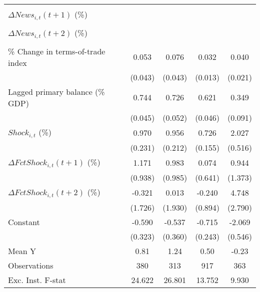 {\begin{tabular}{l*{4}{c}}
                    &                     &                     &                     &                     \\
\addlinespace
$ \Delta News_{i,t}(t+1)$ (\%)&                     &                     &                     &                     \\
                    &                     &                     &                     &                     \\
\addlinespace
$ \Delta News_{i,t}(t+2)$ (\%)&                     &                     &                     &                     \\
                    &                     &                     &                     &                     \\
\addlinespace
\% Change in terms-of-trade index&       0.053         &       0.076\sym{*}  &       0.032\sym{**} &       0.040\sym{*}  \\
                    &     (0.043)         &     (0.043)         &     (0.013)         &     (0.021)         \\
\addlinespace
Lagged primary balance (\% GDP)&       0.744\sym{***}&       0.726\sym{***}&       0.621\sym{***}&       0.349\sym{***}\\
                    &     (0.045)         &     (0.052)         &     (0.046)         &     (0.091)         \\
\addlinespace
$ Shock_{i,t}$ (\%) &       0.970\sym{***}&       0.956\sym{***}&       0.726\sym{***}&       2.027\sym{***}\\
                    &     (0.231)         &     (0.212)         &     (0.155)         &     (0.516)         \\
\addlinespace
$ \Delta FctShock_{i,t}(t+1)$ (\%)&       1.171         &       0.983         &       0.074         &       0.944         \\
                    &     (0.938)         &     (0.985)         &     (0.641)         &     (1.373)         \\
\addlinespace
$ \Delta FctShock_{i,t}(t+2)$ (\%)&      -0.321         &       0.013         &      -0.240         &       4.748         \\
                    &     (1.726)         &     (1.930)         &     (0.894)         &     (2.790)         \\
\addlinespace
Constant            &      -0.590\sym{*}  &      -0.537         &      -0.715\sym{***}&      -2.069\sym{***}\\
                    &     (0.323)         &     (0.360)         &     (0.243)         &     (0.546)         \\
\midrule
Mean Y              &        0.81         &        1.24         &        0.50         &       -0.23         \\
Observations        &         380         &         313         &         917         &         363         \\
Exc. Inst. F-stat   &      24.622         &      26.801         &      13.752         &       9.930         \\
\bottomrule
\end{tabular}
}
